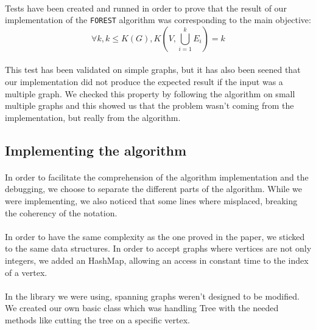 
\paragraph{}
Tests have been created and runned in order to prove that the result of our
implementation of the \verb!FOREST! algorithm was corresponding to the main
objective:
$$\forall k, k \leq K(G),K(V,\bigcup \limits_{i=1}^k E_i) = k$$

\paragraph{}
This test has been validated on simple graphs, but it has also been seened that
our implementation did not produce the expected result if the input was a
multiple graph. We checked this property by following the algorithm on small
multiple graphs and this showed us that the problem wasn't coming from the
implementation, but really from the algorithm.

\subsection{Implementing the algorithm}
\paragraph{}
In order to facilitate the comprehension of the algorithm implementation and the
debugging, we choose to separate the different parts of the algorithm. While
we were implementing, we also noticed that some lines where misplaced, breaking
the coherency of the notation.

\paragraph{}
In order to have the same complexity as the one proved in the paper, we sticked
to the same data structures. In order to accept graphs where vertices are not
only integers, we added an HashMap, allowing an access in constant time to the
index of a vertex.

\paragraph{}
In the library we were using, spanning graphs weren't designed to be modified. We
created our own basic class which was handling Tree with the needed methods like
cutting the tree on a specific vertex.

